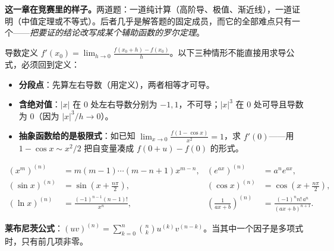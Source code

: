 
\textbf{这一章在竞赛里的样子。}两道题：一道纯计算（高阶导、极值、渐近线），一道证明（中值定理或不等式）。后者几乎是解答题的固定成员，而它的全部难点只有一个——\emph{把要证的结论改写成某个辅助函数的罗尔定理}。


导数定义 $\displaystyle f'(x_0)=\lim_{h\to0}\frac{f(x_0+h)-f(x_0)}{h}$。以下三种情形不能直接用求导公式，必须回到定义：

\begin{itemize}[leftmargin=1.6em,itemsep=1pt]
\item \textbf{分段点}：先算左右导数（用定义），两者相等才可导。
\item \textbf{含绝对值}：$|x|$ 在 0 处左右导数分别为 $-1,1$，不可导；$|x|^3$ 在 0 处可导且导数为 0（因为 $|x|^3/h\to0$）。
\item \textbf{抽象函数给的是极限式}：如已知 $\lim_{x\to0}\frac{f(1-\cos x)}{x^2}=1$，求 $f'(0)$——用 $1-\cos x\sim x^2/2$ 把自变量凑成 $f(0+u)-f(0)$ 的形式。
\end{itemize}



\begin{align*}
(x^m)^{(n)} &= m(m-1)\cdots(m-n+1)x^{m-n}, &
(e^{ax})^{(n)} &= a^n e^{ax},\\
(\sin x)^{(n)} &= \sin\!\left(x+\frac{n\pi}{2}\right), &
(\cos x)^{(n)} &= \cos\!\left(x+\frac{n\pi}{2}\right),\\
(\ln x)^{(n)} &= \frac{(-1)^{n-1}(n-1)!}{x^n}, &
\left(\frac{1}{ax+b}\right)^{(n)} &= \frac{(-1)^n n!\,a^n}{(ax+b)^{n+1}}.
\end{align*}

\textbf{莱布尼茨公式}：$\displaystyle(uv)^{(n)}=\sum_{k=0}^{n}\binom{n}{k}u^{(k)}v^{(n-k)}$。当其中一个因子是多项式时，只有前几项非零。


